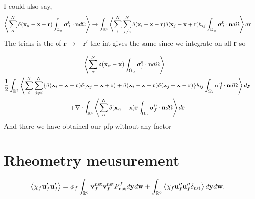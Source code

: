 \documentclass[12pt]{My_preprint}
\begin{document}
I could also say, 
\begin{multline}
    \avg{
        \sum_\alpha^N 
        \delta(\textbf{x}_\alpha - \textbf{x} - \textbf{r})
        \intO{\bm\sigma_f^0 \cdot \textbf{n}}
        }
    \to 
    \int_{\mathbb{R}^3}
    \avg{
        \sum_i^N 
        \sum_{j\neq i }^N 
        \delta(\textbf{x}_i - \textbf{x} - \textbf{r})
            \delta(\textbf{x}_j - \textbf{x} + \textbf{r})
            h_{ij}
        \intO{\bm\sigma_f^0 \cdot \textbf{n}}
    }
    d\textbf{r}
\end{multline}
The tricks is the of $\textbf{r} \to -\textbf{r}'$ the int gives the same since we integrate on all \textbf{r} so 

\begin{multline}
    \avg{
        \sum_\alpha^N 
        \delta(\textbf{x}_\alpha - \textbf{x})
        \intO{\bm\sigma_f^0 \cdot \textbf{n}}
        }
    =\\
    \frac{1}{2}
    \int_{\mathbb{R}^3}
    \avg{
        \sum_i^N 
        \sum_{j\neq i }^N 
        \{
            \delta(\textbf{x}_i - \textbf{x} - \textbf{r})
            \delta(\textbf{x}_j - \textbf{x} + \textbf{r})
            + \delta(\textbf{x}_i - \textbf{x} + \textbf{r})
            \delta(\textbf{x}_j - \textbf{x} - \textbf{r})
        \}
        h_{ij}
        \intO[i]{\bm\sigma_f^0 \cdot \textbf{n}}
    }
    d\textbf{y}
    \\
    + 
    \div
    \int_{\mathbb{R}^3}
    \avg{
    \sum_\alpha^N 
    \delta(\textbf{x}_\alpha - \textbf{x})
    \textbf{r}
    \intO{\bm\sigma_f^0 \cdot \textbf{n}}
    }
    d\textbf{r}
\end{multline}
And there we have obtained our pfp without any factor 
\section*{Rheometry meusurement}

\begin{equation}
    \avg{\chi_f \textbf{u}_f'\textbf{u}_f'}
    = 
    \phi_f
    \int_{\mathbb{R}^6}
    \textbf{v}_f^\text{nst}
    \textbf{v}_f^\text{nst}
    P_\text{nst}^f
    d\textbf{y}
    d\textbf{w}
    + 
    \int_{\mathbb{R}^6}
    \avg{
        \chi_f
        \textbf{u}_f''
        \textbf{u}_f''
        \delta_\text{nst}
    }
    d\textbf{y}
    d\textbf{w}.
\end{equation}
\end{document}
